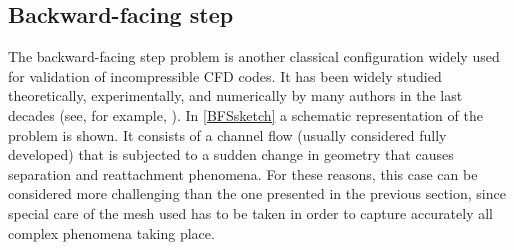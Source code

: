 
\subsection{Backward-facing step}\label{ssec:BackwardFacingStep}
The backward-facing step problem is another classical configuration widely used for validation of incompressible CFD codes. It has been widely studied theoretically, experimentally, and numerically by many authors in the last decades (see, for example, \cite{armalyExperimentalTheoreticalInvestigation1983,barkleyThreedimensionalInstabilityFlow2000,biswasBackwardFacingStepFlows2004} ).  In \cref{BFSsketch} a schematic representation of the problem is shown. It consists of a channel flow (usually considered fully developed) that is subjected to a sudden change in geometry that causes separation and reattachment phenomena. For these reasons, this case can be considered more challenging than the one presented in the previous section, since special care of the mesh used has to be taken in order to capture accurately all complex phenomena taking place.

